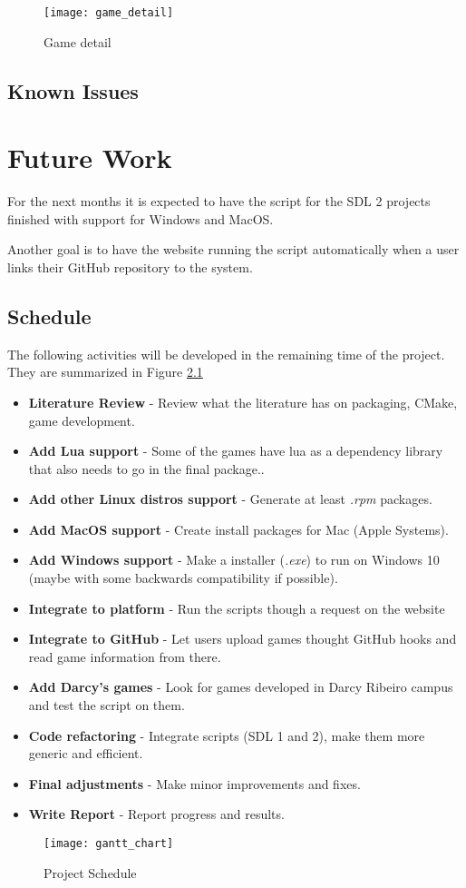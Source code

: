 \begin{figure}[h!]
\centering
\texttt{[image: game\_detail]}
\caption{Game detail}
\label{fig:game_detail}
\end{figure}

\section{Known Issues}


\chapter{Future Work}
\label{sec:future_work}

For the next months it is expected to have the script for the SDL 2 projects finished with support for Windows and MacOS.

Another goal is to have the website running the script automatically when a user links their GitHub repository to the system.


\section{Schedule}
\label{sec:schedule}

The following activities will be developed in the remaining time of the project. They are summarized in Figure \ref{fig:schedule}

\begin{itemize}
\item \textbf{Literature Review} - Review what the literature has on packaging, CMake, game development.
\item \textbf{Add Lua support} - Some of the games have lua as a dependency library that also needs to go in the final package..
\item \textbf{Add other Linux distros support} - Generate at least \textit{.rpm} packages.
\item \textbf{Add MacOS support} - Create install packages for Mac (Apple Systems).
\item \textbf{Add Windows support} - Make a installer (\textit{.exe}) to run on Windows 10 (maybe with some backwards compatibility if possible).
\item \textbf{Integrate to platform} - Run the scripts though a request on the website
\item \textbf{Integrate to GitHub} - Let users upload games thought GitHub hooks and read game information from there.
\item \textbf{Add Darcy's games} - Look for games developed in Darcy Ribeiro campus and test the script on them.
\item \textbf{Code refactoring} - Integrate scripts (SDL 1 and 2), make them more generic and efficient.
\item \textbf{Final adjustments} - Make minor improvements and fixes.
\item \textbf{Write Report} - Report progress and results.
\end{itemize}

\begin{figure}[h!]
\centering
\texttt{[image: gantt\_chart]}
\caption{Project Schedule}
\label{fig:schedule}
\end{figure}
